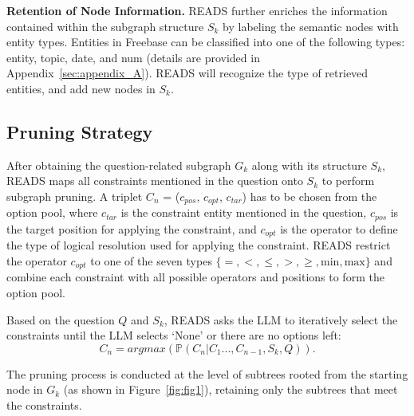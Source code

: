 \documentclass[11pt]{article}
\begin{document}
\noindent\textbf{Retention of Node Information.} READS further enriches the information contained within the subgraph structure $S_{k}$ by labeling the semantic nodes with entity types. Entities in Freebase can be classified into one of the following types: entity, topic, date, and num (details are provided in Appendix~\ref{sec:appendix_A}). READS will recognize the type of retrieved entities, and add new nodes in $S_{k}$.

\subsection{Pruning Strategy}
\label{sec:prune}

After obtaining the question-related subgraph $G_k$ along with its structure $S_k$, READS maps all constraints mentioned in the question onto $S_k$ to perform subgraph pruning. A triplet $C_{n}$ = ($c_{pos}$, $c_{opt}$, $c_{tar}$) has to be chosen from the option pool, where $c_{tar}$ is the constraint entity mentioned in the question, $c_{pos}$ is the target position for applying the constraint, and $c_{opt}$ is the operator to define the type of logical resolution used for applying the constraint. READS restrict the operator $c_{opt}$ to one of the seven types $\{=, <, \le, >, \ge, \text{min}, \text{max}\}$ and combine each constraint with all possible operators and positions to form the option pool. 

Based on the question $Q$ and $S_{k}$, READS asks the LLM to iteratively select the constraints until the LLM selects `None' or there are no options left:
\begin{equation}
    C_{n} = argmax(\mathbb{P}(C_{n}|C_{1}...,C_{n-1},S_{k},Q)).
\end{equation}

The pruning process is conducted at the level of subtrees rooted from the starting node in $G_k$ (as shown in Figure~\ref{fig:fig1}), retaining only the subtrees that meet the constraints.
\end{document}
